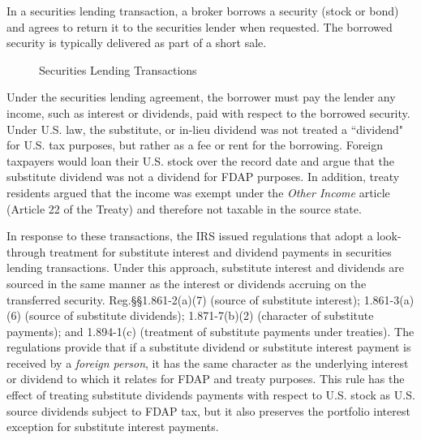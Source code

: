 In a securities lending transaction, a broker borrows a security (stock or bond) and agrees to return it to the securities lender when requested.  The borrowed security is typically delivered as part of a short sale.  
\begin{figure}[hbtp]
\caption{Securities Lending Transactions}
\begin{center}
\setlength\fboxsep{0.5pt}
\setlength\fboxrule{0.5pt}
\end{center}
\label{your-reference-key}
\end{figure}
Under the securities lending agreement, the borrower must pay the lender any income, such as interest or dividends, paid with respect to the borrowed security.  Under U.S. law, the substitute, or in-lieu dividend was not treated a ``dividend" for U.S. tax purposes, but rather as a fee or rent for the borrowing.  Foreign taxpayers would loan their U.S. stock over the record date and argue that the substitute dividend was not a dividend for FDAP purposes.  In addition, treaty residents argued that the income was exempt under the \emph{Other Income} article (Article 22 of the Treaty) and therefore not taxable in the source state.  

In response to these transactions, the IRS issued regulations that  adopt a look-through treatment for substitute interest and dividend payments in securities lending transactions.   Under this approach, substitute interest and dividends are sourced in the same manner as the interest or dividends accruing on the transferred security.  Reg.\@ \S\S1.861-2(a)(7) (source of substitute interest); 1.861-3(a)(6) (source of substitute dividends); 1.871-7(b)(2) (character of substitute payments); and 1.894-1(c) (treatment of substitute payments under treaties).  The regulations provide that if a substitute dividend or substitute interest payment is received by a \emph{foreign person}, it has the same character as the underlying interest or dividend to which it relates for FDAP and treaty purposes. This rule has the effect of treating substitute dividends payments with respect to U.S. stock as U.S. source dividends subject to FDAP tax, but it also preserves the portfolio interest exception for substitute interest payments.

